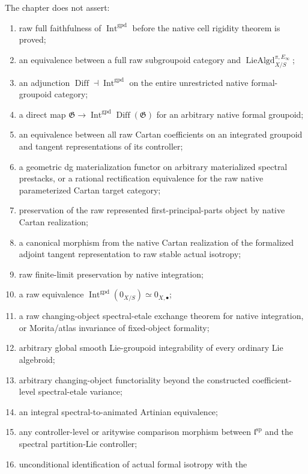 The chapter does not assert:
\begin{enumerate}
    \item raw full faithfulness of
    $\operatorname{Int}^{\mathrm{gpd}}$ before the native cell rigidity theorem
    is proved;
    \item an equivalence between a full raw subgroupoid category and
    $\operatorname{LieAlgd}^{\pi,E_\infty}_{X/S}$;
    \item an adjunction
    $\operatorname{Diff}\dashv\operatorname{Int}^{\mathrm{gpd}}$
    on the entire unrestricted native formal-groupoid category;
    \item a direct map
    $\mathfrak G\to\operatorname{Int}^{\mathrm{gpd}}
      \operatorname{Diff}(\mathfrak G)$
    for an arbitrary native formal groupoid;
    \item an equivalence between all raw Cartan coefficients on an integrated
    groupoid and tangent representations of its controller;
    \item a geometric dg materialization functor on arbitrary materialized
    spectral prestacks, or a rational rectification equivalence for the raw
    native parameterized Cartan target category;
    \item preservation of the raw represented first-principal-parts object by
    native Cartan realization;
    \item a canonical morphism from the native Cartan realization of the
    formalized adjoint tangent representation to raw stable actual isotropy;
    \item raw finite-limit preservation by native integration;
    \item a raw equivalence
    $\operatorname{Int}^{\mathrm{gpd}}(0_{X/S})\simeq0_{X,\bullet}$;
    \item a raw changing-object spectral-etale exchange theorem for native
    integration, or Morita/atlas invariance of fixed-object formality;
    \item arbitrary global smooth Lie-groupoid integrability of every ordinary
    Lie algebroid;
    \item arbitrary changing-object functoriality beyond the constructed
    coefficient-level spectral-etale variance;
    \item an integral spectral-to-animated Artinian equivalence;
    \item any controller-level or aritywise comparison morphism between
    $\mathfrak l^{\mathrm{sp}}$ and the spectral partition-Lie controller;
    \item unconditional identification of actual formal isotropy with the

\end{enumerate}
